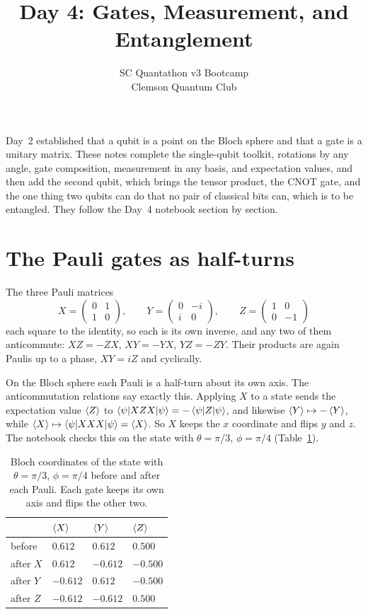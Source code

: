 \documentclass[11pt]{article}
\title{Day 4: Gates, Measurement, and Entanglement}
\author{SC Quantathon v3 Bootcamp \\ Clemson Quantum Club}
\date{}
\begin{document}
\maketitle

\noindent
Day~2 established that a qubit is a point on the Bloch sphere and that a gate is a unitary matrix. These notes complete the single-qubit toolkit, rotations by any angle, gate composition, measurement in any basis, and expectation values, and then add the second qubit, which brings the tensor product, the CNOT gate, and the one thing two qubits can do that no pair of classical bits can, which is to be entangled. They follow the Day~4 notebook section by section.

\section{The Pauli gates as half-turns}

The three Pauli matrices
\begin{equation}
X = \begin{pmatrix}0&1\\1&0\end{pmatrix},\qquad
Y = \begin{pmatrix}0&-i\\i&0\end{pmatrix},\qquad
Z = \begin{pmatrix}1&0\\0&-1\end{pmatrix}
\label{eq:pauli}
\end{equation}
each square to the identity, so each is its own inverse, and any two of them anticommute: $XZ = -ZX$, $XY = -YX$, $YZ = -ZY$. Their products are again Paulis up to a phase, $XY = iZ$ and cyclically.

On the Bloch sphere each Pauli is a half-turn about its own axis. The anticommutation relations say exactly this. Applying $X$ to a state sends the expectation value $\braket{Z}$ to $\braket{\psi|XZX|\psi} = -\braket{\psi|Z|\psi}$, and likewise $\braket{Y}\mapsto-\braket{Y}$, while $\braket{X}\mapsto\braket{\psi|XXX|\psi} = \braket{X}$. So $X$ keeps the $x$ coordinate and flips $y$ and $z$. The notebook checks this on the state with $\theta = \pi/3$, $\phi = \pi/4$ (Table~\ref{tab:halfturn}).

\begin{table}[h]
\centering
\small
\begin{tabular}{@{}llll@{}}
\toprule
& $\braket{X}$ & $\braket{Y}$ & $\braket{Z}$ \\
\midrule
before & $0.612$ & $0.612$ & $0.500$ \\
after $X$ & $0.612$ & $-0.612$ & $-0.500$ \\
after $Y$ & $-0.612$ & $0.612$ & $-0.500$ \\
after $Z$ & $-0.612$ & $-0.612$ & $0.500$ \\
\bottomrule
\end{tabular}
\caption{Bloch coordinates of the state with $\theta = \pi/3$, $\phi = \pi/4$ before and after each Pauli. Each gate keeps its own axis and flips the other two.}
\label{tab:halfturn}
\end{table}
\end{document}
